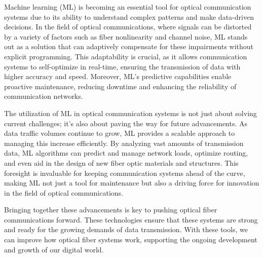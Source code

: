 

Machine learning (ML) is becoming an essential tool for optical communication systems due to its ability to understand complex patterns and make data-driven decisions. In the field of optical communications, where signals can be distorted by a variety of factors such as fiber nonlinearity and channel noise, ML stands out as a solution that can adaptively compensate for these impairments without explicit programming. This adaptability is crucial, as it allows communication systems to self-optimize in real-time, ensuring the transmission of data with higher accuracy and speed. Moreover, ML's predictive capabilities enable proactive maintenance, reducing downtime and enhancing the reliability of communication networks.

The utilization of ML in optical communication systems is not just about solving current challenges; it's also about paving the way for future advancements. As data traffic volumes continue to grow, ML provides a scalable approach to managing this increase efficiently. By analyzing vast amounts of transmission data, ML algorithms can predict and manage network loads, optimize routing, and even aid in the design of new fiber optic materials and structures. This foresight is invaluable for keeping communication systems ahead of the curve, making ML not just a tool for maintenance but also a driving force for innovation in the field of optical communications.




Bringing together these advancements is key to pushing optical fiber communications forward. These technologies ensure that these systems are strong and ready for the growing demands of data transmission. With these tools, we can improve how optical fiber systems work, supporting the ongoing development and growth of our digital world.




